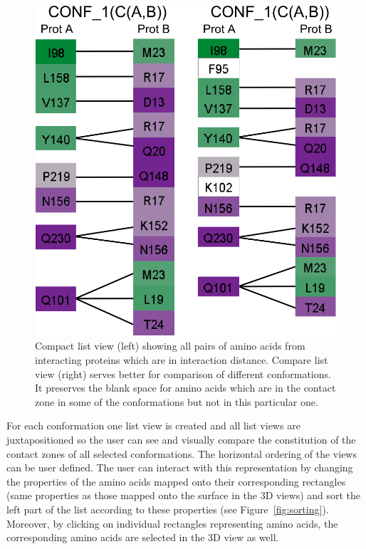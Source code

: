 \documentclass[journal]{vgtc}                %
\begin{document}
\begin{figure}[bt]
  \centering
  \includegraphics[width=0.7\columnwidth]{list.png}
  \caption{Compact list view (left) showing all pairs of amino acids from interacting proteins which are in interaction distance. Compare list view (right) serves better for comparison of different conformations. It preserves the blank space for amino acids which are in the contact zone in some of the conformations but not in this particular one.}
  \label{fig:list}
\end{figure}

For each conformation one list view is created and all list views are juxtapositioned so the user can see and visually compare the constitution of the contact zones of all selected conformations.
The horizontal ordering of the views can be user defined.
The user can interact with this representation by changing the properties of the amino acids mapped onto their corresponding rectangles (same properties as those mapped onto the surface in the 3D views) and sort the left part of the list according to these properties (see Figure~\ref{fig:sorting}).
Moreover, by clicking on individual rectangles representing amino acids, the corresponding amino acids are selected in the 3D view as well.
\end{document}
